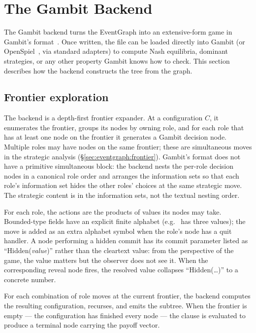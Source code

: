 \section{The Gambit Backend}
\label{sec:gambit}

The Gambit backend turns the EventGraph into an extensive-form game
in Gambit's  format~\citep{McKelveyMcLennanTurocy2006Gambit}.
Once written, the file can be loaded directly into Gambit (or
OpenSpiel~\citep{LanctotEtAl2019OpenSpiel}, via standard adapters)
to compute Nash equilibria, dominant strategies, or any other
property Gambit knows how to check.  This section describes how the
backend constructs the tree from the graph.

\subsection{Frontier exploration}

The backend is a depth-first frontier expander.  At a configuration
$C$, it enumerates the frontier, groups its nodes by owning role,
and for each role that has at least one node on the frontier it
generates a Gambit decision node.  Multiple roles may have nodes on
the same frontier; these are simultaneous moves in the strategic
analysis (\S\ref{sec:eventgraph:frontier}).  Gambit's 
format does not have a primitive simultaneous block: the backend
nests the per-role decision nodes in a canonical role order and
arranges the information sets so that each role's information set
hides the other roles' choices at the same strategic move.  The
strategic content is in the information sets, not the textual
nesting order.

For each role, the actions are the products of values its nodes may
take.  Bounded-type fields have an explicit finite alphabet
(e.g.\  has three values); the  move
is added as an extra alphabet symbol when the role's node has a
quit handler.  A node performing a hidden commit has its commit
parameter listed as ``Hidden(\textit{value})'' rather than the
cleartext value: from the perspective of the game, the value
matters but the observer does not see it.  When the corresponding
reveal node fires, the resolved value collapses ``Hidden(\dots)''
to a concrete number.

For each combination of role moves at the current frontier, the
backend computes the resulting configuration, recurses, and emits
the subtree.  When the frontier is empty --- the configuration has
finished every node --- the  clause is evaluated to
produce a terminal node carrying the payoff vector.

